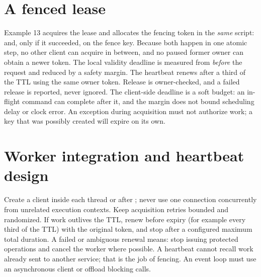 \section{A fenced lease}\label{sec:fenced-lease}
Example 13 acquires the lease and allocates the fencing token in the \emph{same} script:  and, only if it succeeded,  on the fence key. Because both happen in one atomic step, no other client can acquire in between, and no paused former owner can obtain a newer token. The local validity deadline is measured from \emph{before} the request and reduced by a safety margin. The heartbeat renews after a third of the TTL using the same owner token. Release is owner-checked, and a failed release is reported, never ignored.
The client-side deadline is a soft budget: an in-flight command can complete after it, and the margin does not bound scheduling delay or clock error. An exception during acquisition must not authorize work; a key that was possibly created will expire on its own.

\section{Worker integration and heartbeat design}
Create a client inside each thread or after ; never use one connection concurrently from unrelated execution contexts. Keep acquisition retries bounded and randomized. If work outlives the TTL, renew before expiry (for example every third of the TTL) with the original token, and stop after a configured maximum total duration. A failed or ambiguous renewal means: stop issuing protected operations and cancel the worker where possible. A heartbeat cannot recall work already sent to another service; that is the job of fencing. An event loop must use an asynchronous client or offload blocking calls.

